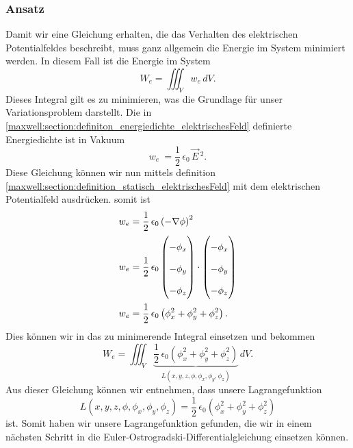 \subsubsection{Ansatz}
Damit wir eine Gleichung erhalten, die das Verhalten des elektrischen Potentialfeldes beschreibt, muss ganz allgemein die Energie im System minimiert werden. 
In diesem Fall ist die Energie im System
\[
W_e
=
\iiint_V w_e\, dV.
\]
Dieses Integral gilt es zu minimieren, was die Grundlage für unser Variationsproblem darstellt.
Die in \eqref{maxwell:section:definiton_energiedichte_elektrischesFeld} definierte Energiedichte ist in Vakuum
\[
w_e\
=
\frac{1}{2}\,\epsilon_0\,\vec{E}\,^2.
\]
Diese Gleichung können wir nun mittels definition \eqref{maxwell:section:definition_statisch_elektrischesFeld} mit dem elektrischen Potentialfeld ausdrücken.
somit ist
\begin{align}
\renewcommand{\arraystretch}{1.9}
w_e
&=
\frac{1}{2}\,\epsilon_0\left(-\nabla\phi\right)^2
\\
w_e
&=
\frac{1}{2}\,\epsilon_0
\begin{pmatrix}
\displaystyle
-\phi_x\\
\displaystyle
-\phi_y\\
\displaystyle
-\phi_z
\end{pmatrix}
\cdot
\begin{pmatrix}
\displaystyle
-\phi_x\\
\displaystyle
-\phi_y\\
\displaystyle
-\phi_z
\end{pmatrix}
\\
w_e
&=
\frac{1}{2}\,\epsilon_0\left(\phi_x^2 + \phi_y^2 + \phi_z^2\right).
\label{maxwell:section:energiedichte}
\end{align}
Dies können wir in das zu minimerende Integral einsetzen und bekommen
\begin{equation}
	W_e
	=
	\iiint_V \underbrace{
		\frac{1}{2}\,\epsilon_0\left(\phi_x^2 + \phi_y^2 + \phi_z^2\right)}_{L(x,y,z,\phi,\phi_x,\phi_y,\phi_z)}\, dV.
	\label{maxwell:section:energieintegral_quellenfrei}
\end{equation}
Aus dieser Gleichung können wir entnehmen, dass unsere Lagrangefunktion
\begin{equation}
	L(x,y,z,\phi,\phi_x,\phi_y,\phi_z)
	=
	\frac{1}{2}\,\epsilon_0\left(\phi_x^2 + \phi_y^2 + \phi_z^2\right)
	\label{maxwell:section:lagrangefunktion_quellenfrei}
\end{equation}
ist.
Somit haben wir unsere Lagrangefunktion gefunden, die wir in einem nächsten Schritt in die Euler-Ostrogradski-Differentialgleichung einsetzen können.

